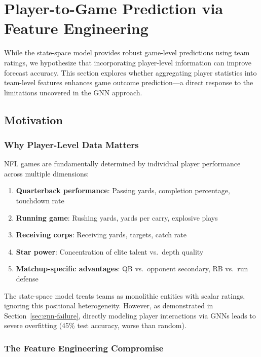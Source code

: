 \section{Player-to-Game Prediction via Feature Engineering}
\label{sec:player-to-game}

While the state-space model provides robust game-level predictions using team ratings, we hypothesize that incorporating player-level information can improve forecast accuracy. This section explores whether aggregating player statistics into team-level features enhances game outcome prediction---a direct response to the limitations uncovered in the GNN approach.

\subsection{Motivation}

\subsubsection{Why Player-Level Data Matters}

NFL games are fundamentally determined by individual player performance across multiple dimensions:

\begin{enumerate}
    \item \textbf{Quarterback performance}: Passing yards, completion percentage, touchdown rate
    \item \textbf{Running game}: Rushing yards, yards per carry, explosive plays
    \item \textbf{Receiving corps}: Receiving yards, targets, catch rate
    \item \textbf{Star power}: Concentration of elite talent vs.\ depth quality
    \item \textbf{Matchup-specific advantages}: QB vs.\ opponent secondary, RB vs.\ run defense
\end{enumerate}

The state-space model treats teams as monolithic entities with scalar ratings, ignoring this positional heterogeneity. However, as demonstrated in Section~\ref{sec:gnn-failure}, directly modeling player interactions via GNNs leads to severe overfitting (45\% test accuracy, worse than random).

\subsubsection{The Feature Engineering Compromise}

